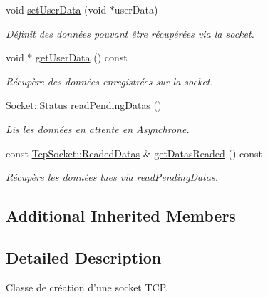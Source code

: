 \begin{DoxyCompactItemize}
void \hyperlink{classmognetwork_1_1_tcp_socket_a2d7327be349e705c74bdc6b40c1b2520}{set\-User\-Data} (void $\ast$user\-Data)
\begin{DoxyCompactList}\small\item\em Définit des données pouvant être récupérées via la socket. \end{DoxyCompactList}\item 
void $\ast$ \hyperlink{classmognetwork_1_1_tcp_socket_adef63a929423324fd75888e2195176e0}{get\-User\-Data} () const 
\begin{DoxyCompactList}\small\item\em Récupère des données enregistrées sur la socket. \end{DoxyCompactList}\item 
\hyperlink{classmognetwork_1_1_socket_aa187a8394ac0d6203af0ec7f021ca15f}{Socket\-::\-Status} \hyperlink{classmognetwork_1_1_tcp_socket_af3918374ee41223b77f669367d4b0e22}{read\-Pending\-Datas} ()
\begin{DoxyCompactList}\small\item\em Lis les données en attente en Asynchrone. \end{DoxyCompactList}\item 
const \hyperlink{structmognetwork_1_1_tcp_socket_1_1_readed_datas}{Tcp\-Socket\-::\-Readed\-Datas} \& \hyperlink{classmognetwork_1_1_tcp_socket_ab4bdcfa0a9fa23643307200ad7379510}{get\-Datas\-Readed} () const 
\begin{DoxyCompactList}\small\item\em Récupère les données lues via read\-Pending\-Datas. \end{DoxyCompactList}\end{DoxyCompactItemize}
\subsection*{Additional Inherited Members}


\subsection{Detailed Description}
Classe de création d'une socket T\-C\-P. 

